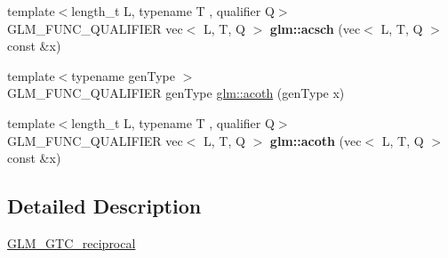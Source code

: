 \begin{DoxyCompactItemize}
{\footnotesize template$<$length\+\_\+t L, typename T , qualifier Q$>$ }\\G\+L\+M\+\_\+\+F\+U\+N\+C\+\_\+\+Q\+U\+A\+L\+I\+F\+I\+ER vec$<$ L, T, Q $>$ {\bfseries glm\+::acsch} (vec$<$ L, T, Q $>$ const \&x)
\item 
{\footnotesize template$<$typename gen\+Type $>$ }\\G\+L\+M\+\_\+\+F\+U\+N\+C\+\_\+\+Q\+U\+A\+L\+I\+F\+I\+ER gen\+Type \hyperlink{group__gtc__reciprocal_gafaca98a7100170db8841f446282debfa}{glm\+::acoth} (gen\+Type x)
\item 
\mbox{\label{reciprocal_8inl_a139b88e66938168dc495f00d6a4aa376}} 
{\footnotesize template$<$length\+\_\+t L, typename T , qualifier Q$>$ }\\G\+L\+M\+\_\+\+F\+U\+N\+C\+\_\+\+Q\+U\+A\+L\+I\+F\+I\+ER vec$<$ L, T, Q $>$ {\bfseries glm\+::acoth} (vec$<$ L, T, Q $>$ const \&x)
\end{DoxyCompactItemize}


\subsection{Detailed Description}
\hyperlink{group__gtc__reciprocal}{G\+L\+M\+\_\+\+G\+T\+C\+\_\+reciprocal} 